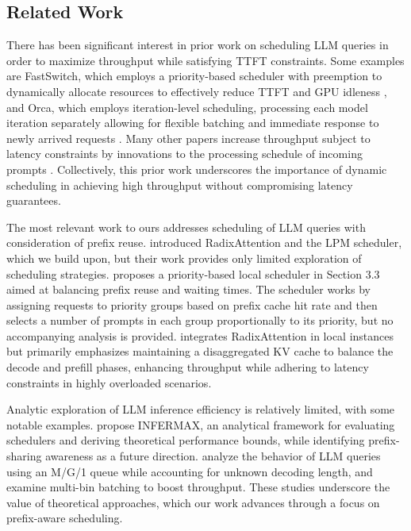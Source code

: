\subsection{Related Work}

There has been significant interest in prior work on scheduling LLM queries in order to maximize throughput while satisfying TTFT constraints. Some examples are FastSwitch, which employs a priority-based scheduler with preemption to dynamically allocate resources to effectively reduce TTFT and GPU idleness \cite{shen2024fastswitch}, and Orca, which employs iteration-level scheduling, processing each model iteration separately allowing for flexible batching and immediate response to newly arrived requests \cite{yu2022orca}. Many other papers increase throughput subject to latency constraints by innovations to the processing schedule of incoming prompts \cite{zhong2024distserve, patel2024splitwise, jain2024intelligent, agrawal2024taming}. Collectively, this prior work underscores the importance of dynamic scheduling in achieving high throughput without compromising latency guarantees.

The most relevant work to ours addresses scheduling of LLM queries with consideration of prefix reuse. \citet{zheng2024sglang} introduced RadixAttention and the LPM scheduler, which we build upon, but their work provides only limited exploration of scheduling strategies. \citet{srivatsa2024preble} proposes a priority-based local scheduler in Section 3.3 aimed at balancing prefix reuse and waiting times. The scheduler works by assigning requests to priority groups based on prefix cache hit rate and then selects a number of prompts in each group proportionally to its priority, but no accompanying analysis is provided. \citet{qin2024mooncake} integrates RadixAttention in local instances but primarily emphasizes maintaining a disaggregated KV cache to balance the decode and prefill phases, enhancing throughput while adhering to latency constraints in highly overloaded scenarios.

Analytic exploration of LLM inference efficiency is relatively limited, with some notable examples. \citet{kim2024effect} propose INFERMAX, an analytical framework for evaluating schedulers and deriving theoretical performance bounds, while identifying prefix-sharing awareness as a future direction. \citet{yang2024queueing} analyze the behavior of LLM queries using an M/G/1 queue while accounting for unknown decoding length, and \citet{guldogan2024multi} examine multi-bin batching to boost throughput. These studies underscore the value of theoretical approaches, which our work advances through a focus on prefix-aware scheduling.



